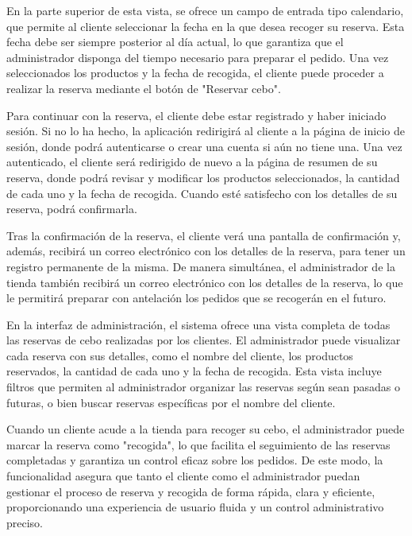 \vspace{0.5cm}

En la parte superior de esta vista, se ofrece un campo de entrada tipo calendario, que permite al cliente seleccionar la fecha en la que desea recoger su reserva. Esta fecha debe ser siempre posterior al día actual, lo que garantiza que el administrador disponga del tiempo necesario para preparar el pedido. Una vez seleccionados los productos y la fecha de recogida, el cliente puede proceder a realizar la reserva mediante el botón de "Reservar cebo". 

\vspace{0.5cm}

Para continuar con la reserva, el cliente debe estar registrado y haber iniciado sesión. Si no lo ha hecho, la aplicación redirigirá al cliente a la página de inicio de sesión, donde podrá autenticarse o crear una cuenta si aún no tiene una. Una vez autenticado, el cliente será redirigido de nuevo a la página de resumen de su reserva, donde podrá revisar y modificar los productos seleccionados, la cantidad de cada uno y la fecha de recogida. Cuando esté satisfecho con los detalles de su reserva, podrá confirmarla.

\vspace{0.5cm}

Tras la confirmación de la reserva, el cliente verá una pantalla de confirmación y, además, recibirá un correo electrónico con los detalles de la reserva, para tener un registro permanente de la misma. De manera simultánea, el administrador de la tienda también recibirá un correo electrónico con los detalles de la reserva, lo que le permitirá preparar con antelación los pedidos que se recogerán en el futuro.

\vspace{0.5cm}

En la interfaz de administración, el sistema ofrece una vista completa de todas las reservas de cebo realizadas por los clientes. El administrador puede visualizar cada reserva con sus detalles, como el nombre del cliente, los productos reservados, la cantidad de cada uno y la fecha de recogida. Esta vista incluye filtros que permiten al administrador organizar las reservas según sean pasadas o futuras, o bien buscar reservas específicas por el nombre del cliente. 

\vspace{0.5cm}

Cuando un cliente acude a la tienda para recoger su cebo, el administrador puede marcar la reserva como "recogida", lo que facilita el seguimiento de las reservas completadas y garantiza un control eficaz sobre los pedidos. De este modo, la funcionalidad asegura que tanto el cliente como el administrador puedan gestionar el proceso de reserva y recogida de forma rápida, clara y eficiente, proporcionando una experiencia de usuario fluida y un control administrativo preciso.